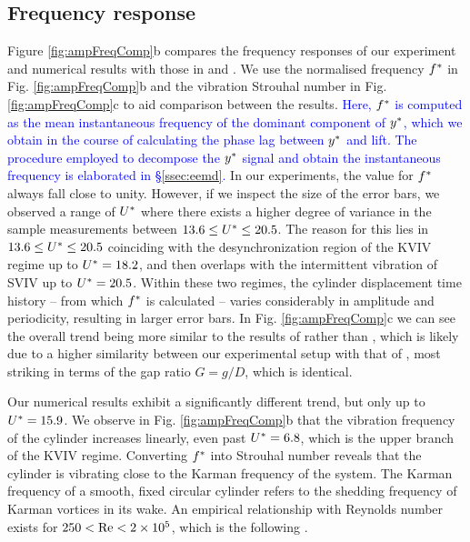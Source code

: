 \documentclass[a4paper,fleqn]{cas-sc}
\begin{document}
\subsection{Frequency response} \label{ssec:freResp}
Figure \ref{fig:ampFreqComp}b compares the frequency responses of our experiment and numerical results with those in \citet{Nguyen2012} and \citet{Koide2013}. We use the normalised frequency  $f^{*}$ in Fig. \ref{fig:ampFreqComp}b and the vibration Strouhal number in Fig. \ref{fig:ampFreqComp}c to aid comparison between the results. \textcolor{blue}{Here, $f^{*}$ is computed as the mean instantaneous frequency of the dominant component of $y^{*}$, which we obtain in the course of calculating the phase lag between $y^{*}$ and lift. The procedure employed to decompose the $y^{*}$ signal and obtain the instantaneous frequency is elaborated in \S\ref{ssec:eemd}.} In our experiments, the value for  $f^{*}$ always fall close to unity. However, if we inspect the size of the error bars, we observed a range of  $U^{*}$ where there exists a higher degree of variance in the sample measurements between  $13.6 \leq U^{*} \leq 20.5$. The reason for this lies in  $13.6 \leq U^{*} \leq 20.5$ coinciding with the desynchronization region of the KVIV regime up to  $U^{*} = 18.2$, and then overlaps with the intermittent vibration of SVIV up to  $U^{*} = 20.5$. Within these two regimes, the cylinder displacement time history -- from which  $f^{*}$ is calculated -- varies considerably in amplitude and periodicity, resulting in larger error bars. In Fig. \ref{fig:ampFreqComp}c we can see the overall trend being more similar to the results of \citet{Koide2013} rather than \citet{Nguyen2012}, which is likely due to a higher similarity between our experimental setup with that of \citet{Koide2013}, most striking in terms of the gap ratio  $G = g/D$, which is identical.

Our numerical results exhibit a significantly different trend, but only up to  $U^{*} = 15.9$. We observe in Fig. \ref{fig:ampFreqComp}b that the vibration frequency of the cylinder increases linearly, even past  $U^{*} = 6.8$, which is the upper branch of the KVIV regime. Converting  $f^{*}$ into Strouhal number reveals that the cylinder is vibrating close to the Karman frequency of the system. The Karman frequency of a smooth, fixed circular cylinder refers to the shedding frequency of Karman vortices in its wake. An empirical relationship with Reynolds number exists for  $250 < \text{Re} < 2 \times 10^{5}$, which is the following \citep{Blevins1990}.
\end{document}
